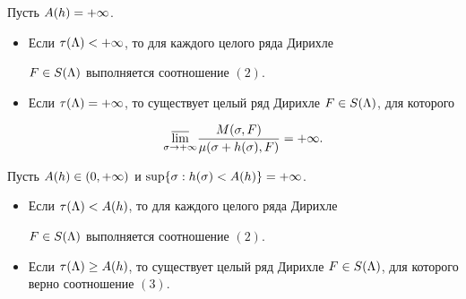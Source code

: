\begin{thm}


Пусть $A(h)=+\infty$. 


\begin{itemize}


\item[(i)] Если $\tau(\Lambda)<+\infty$, то для каждого целого ряда Дирихле


$F\in S(\Lambda)$ выполняется соотношение $(2)$.


\item[(ii)] Если $\t(\L)=+\i$, то существует целый ряд Дирихле $F\in


S(\L)$, для которого


\begin{equation}


\underset{\s\to+\i}\vl{}\frac{\M}{\mu(\s+h(\s),F)}=+\i.


\end{equation}


\end{itemize}


\end{thm}





\begin{thm}


Пусть $A(h)\in (0,+\infty)$ и $\sup\{\sigma:h(\sigma)<A(h)\}=+\infty$. 


\begin{itemize}


\item[(i)] Если $\tau(\Lambda)<A(h)$, то для каждого целого ряда Дирихле


$F\in S(\Lambda)$ выполняется соотношение $(2)$.


\item[(ii)] Если $\t(\L)\ge A(h)$, то существует целый ряд Дирихле $F\in


S(\L)$, для которого верно соотношение $(3)$.


\end{itemize}


\end{thm}





